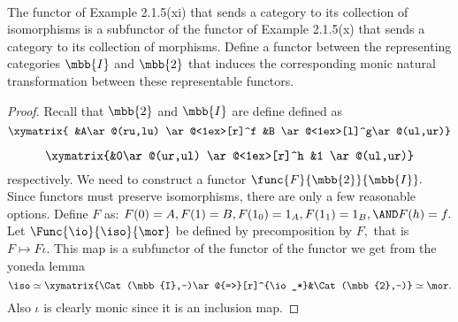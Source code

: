 \documentclass[main.tex]{subfiles}
\begin{document}
\paragraph{}
\begin{exercise}
	The functor of Example 2.1.5(xi) that sends a category to its collection of 
	isomorphisms is a subfunctor of the functor of Example 2.1.5(x) that sends 
	a category to its collection of morphisms. Define a functor between the 
	representing categories $ \mbb{I} $ and $ \mbb{2} $ that induces the 
	corresponding monic natural transformation between these representable 
	functors. 
\end{exercise}
	
\begin{proof}
	Recall that $ \mbb{2} $ and $ \mbb{I} $ are define defined as
	$$
	\xymatrix{
		&A\ar@(ru,lu)  \ar@<1ex>[r]^f
		&B \ar@<1ex>[l]^g\ar@(ul,ur)}
	$$
	
	$$
	\xymatrix{&0\ar@(ur,ul)  \ar@<1ex>[r]^h
		&1 \ar@(ul,ur)}
	$$
	respectively.
We need to construct a functor $ \func{F}{\mbb{2}}{\mbb{I}}.$
Since functors must preserve isomorphisms, there are only a few reasonable 
options. Define $ F $ as: $ F(0)=A,F(1)=B, F(1_0)=1_A,F(1_1)=1_B,\AND F(h)= 
f.$ Let $\Func{\io}{\iso}{\mor}$ be defined by precomposition by $F,$ that is $ 
F\mapsto F\iota. $ This map is a subfunctor of the functor of the functor we 
get from the yoneda lemma
$$
\iso \simeq \xymatrix{\Cat(\mbb{I},-)\ar@{=>}[r]^{\io_*}&\Cat(\mbb{2},-)} \simeq \mor.
$$
Also $ \iota $ is clearly monic since it is an inclusion map.
\end{proof}
\end{document}
